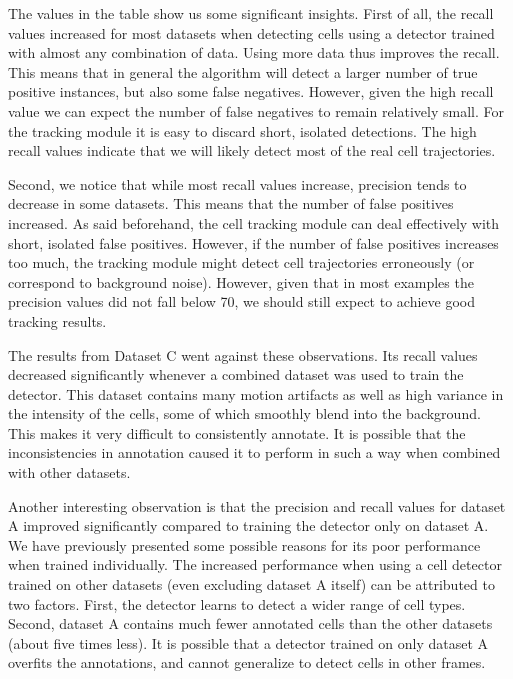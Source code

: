		The values in the table show us some significant insights. First of all, the recall values increased for most datasets when detecting cells using a detector trained with almost any combination of data. Using more data thus improves the recall. This means that in general the algorithm will detect a larger number of true positive instances, but also some false negatives. However, given the high recall value we can expect the number of false negatives to remain relatively small. For the tracking module it is easy to discard short, isolated detections. The high recall values indicate that we will likely detect most of the real cell trajectories.
		
		Second, we notice that while most recall values increase, precision tends to decrease in some datasets. This means that the number of false positives increased. As said beforehand, the cell tracking module can deal effectively with short, isolated false positives. However, if the number of false positives increases too much, the tracking module might detect cell trajectories erroneously (or correspond to background noise). However, given that in most examples the precision values did not fall below 70, we should still expect to achieve good tracking results.
		
		The results from Dataset C went against these observations. Its recall values decreased significantly whenever a combined dataset was used to train the detector. This dataset contains many motion artifacts as well as high variance in the intensity of the cells, some of which smoothly blend into the background. This makes it very difficult to consistently annotate. It is possible that the inconsistencies in annotation caused it to perform in such a way when combined with other datasets.
		
		Another interesting observation is that the precision and recall values for dataset A improved significantly compared to training the detector only on dataset A. We have previously presented some possible reasons for its poor performance when trained individually. The increased performance when using a cell detector trained on other datasets (even excluding dataset A itself) can be attributed to two factors. First, the detector learns to detect a wider range of cell types. Second, dataset A contains much fewer annotated cells than the other datasets (about five times less). It is possible that a detector trained on only dataset A overfits the annotations, and cannot generalize to detect cells in other frames. 
		
